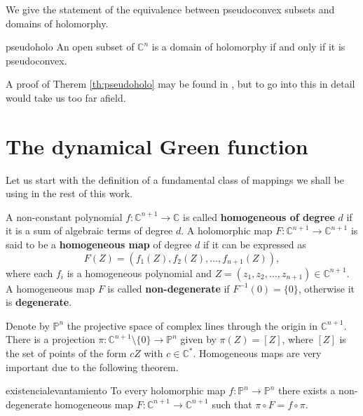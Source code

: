 We give the statement of the equivalence between pseudoconvex subsets and domains of holomorphy.\\

\begin{mytheo}{}{pseudoholo}
An open subset of $\mathbb{C}^n$ is a domain of holomorphy if and only if it is pseudoconvex.
\end{mytheo}

A proof of Therem \ref{th:pseudoholo} may be found in \cite[Theorem 4.2.8]{hormander}, but to go into this in detail would take us too far afield.\\

\section{The dynamical Green function}\label{sec:secciongreen}

Let us start with the definition of a fundamental class of mappings we shall be using in the rest of this work.\\

\begin{mydef}{}{}
A non-constant polynomial $f:\mathbb{C}^{n+1} \rightarrow \mathbb{C}$ is called {\bf homogeneous of degree} $d$ if it is a sum of algebraic terms of degree $d$. A holomorphic map $F:\mathbb{C}^{n+1} \rightarrow \mathbb{C}^{n+1}$ is said to be a {\bf homogeneous map} of degree $d$ if it can be expressed as 
$$F(Z) = (f_1(Z),f_2(Z),\dots, f_{n+1}(Z)),$$
where each $f_i$ is a homogeneous polynomial and $Z = (z_1,z_2,\dots,z_{n+1})\in \mathbb{C}^{n+1}$. A homogeneous map $F$ is called {\bf non-degenerate} if $F^{-1}(0)=\{0\}$, otherwise it is {\bf degenerate}.
\end{mydef}

Denote by $\mathbb{P}^n$ the projective space of complex lines through the origin in $\mathbb{C}^{n+1}$. There is a projection $\pi:\mathbb{C}^{n+1}\setminus\{0\}\rightarrow \mathbb{P}^n$ given by $\pi(Z) = [Z]$, where $[Z]$ is the set of points of the form $cZ$ with $c\in \mathbb{C}^*$. Homogeneous maps are very important due to the following theorem.

\begin{mytheo}{}{existencialevantamiento}
To every holomorphic map $f:\mathbb{P}^n \rightarrow \mathbb{P}^n$ there exists a non-degenerate homogeneous map $F:\mathbb{C}^{n+1}\rightarrow \mathbb{C}^{n+1}$ such that $\pi\circ F = f \circ \pi$.
\end{mytheo}

